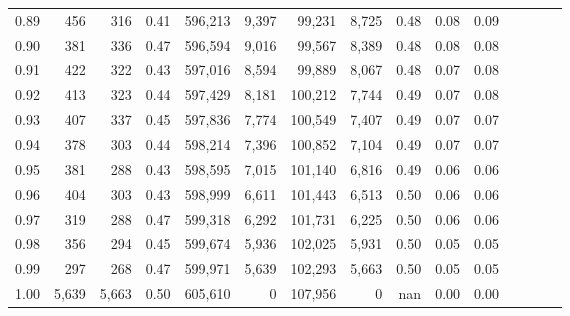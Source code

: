 \begin{tabular}{rrrcrrrrrrrrrrr}
0.89 &     456 &    316 &                                       0.41 &  596,213 &    9,397 &   99,231 &    8,725 &  0.48 &  0.08 &                         0.09 \\
0.90 &     381 &    336 &                                       0.47 &  596,594 &    9,016 &   99,567 &    8,389 &  0.48 &  0.08 &                         0.08 \\
0.91 &     422 &    322 &                                       0.43 &  597,016 &    8,594 &   99,889 &    8,067 &  0.48 &  0.07 &                         0.08 \\
0.92 &     413 &    323 &                                       0.44 &  597,429 &    8,181 &  100,212 &    7,744 &  0.49 &  0.07 &                         0.08 \\
0.93 &     407 &    337 &                                       0.45 &  597,836 &    7,774 &  100,549 &    7,407 &  0.49 &  0.07 &                         0.07 \\
0.94 &     378 &    303 &                                       0.44 &  598,214 &    7,396 &  100,852 &    7,104 &  0.49 &  0.07 &                         0.07 \\
0.95 &     381 &    288 &                                       0.43 &  598,595 &    7,015 &  101,140 &    6,816 &  0.49 &  0.06 &                         0.06 \\
0.96 &     404 &    303 &                                       0.43 &  598,999 &    6,611 &  101,443 &    6,513 &  0.50 &  0.06 &                         0.06 \\
0.97 &     319 &    288 &                                       0.47 &  599,318 &    6,292 &  101,731 &    6,225 &  0.50 &  0.06 &                         0.06 \\
0.98 &     356 &    294 &                                       0.45 &  599,674 &    5,936 &  102,025 &    5,931 &  0.50 &  0.05 &                         0.05 \\
0.99 &     297 &    268 &                                       0.47 &  599,971 &    5,639 &  102,293 &    5,663 &  0.50 &  0.05 &                         0.05 \\
1.00 &   5,639 &  5,663 &                                       0.50 &  605,610 &        0 &  107,956 &        0 &   nan &  0.00 &                         0.00 \\
\bottomrule
\end{tabular}
